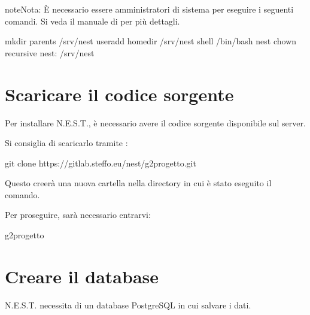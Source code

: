 \documentclass[letterpaper,10pt,italian]{sphinxmanual}
\begin{document}
\begin{sphinxadmonition}{note}{Nota:}
\sphinxAtStartPar
È necessario essere amministratori di sistema per eseguire i seguenti comandi.
Si veda il manuale di  per più dettagli.
\end{sphinxadmonition}

\begin{sphinxVerbatim}[commandchars=\\\{\}]
mkdir \PYGZhy{}\PYGZhy{}parents /srv/nest
useradd \PYGZhy{}\PYGZhy{}home\PYGZhy{}dir /srv/nest \PYGZhy{}\PYGZhy{}shell /bin/bash nest
chown \PYGZhy{}\PYGZhy{}recursive nest: /srv/nest
\end{sphinxVerbatim}


\section{Scaricare il codice sorgente}
\label{\detokenize{guide/installation:scaricare-il-codice-sorgente}}
\sphinxAtStartPar
Per installare N.E.S.T., è necessario avere il codice sorgente disponibile sul server.

\sphinxAtStartPar
Si consiglia di scaricarlo tramite :

\begin{sphinxVerbatim}[commandchars=\\\{\}]
git clone https://gitlab.steffo.eu/nest/g2\PYGZhy{}progetto.git
\end{sphinxVerbatim}

\sphinxAtStartPar
Questo creerà una nuova cartella  nella directory in cui è stato eseguito il comando.

\sphinxAtStartPar
Per proseguire, sarà necessario entrarvi:

\begin{sphinxVerbatim}[commandchars=\\\{\}]
 g2\PYGZhy{}progetto
\end{sphinxVerbatim}


\section{Creare il database}
\label{\detokenize{guide/installation:creare-il-database}}
\sphinxAtStartPar
N.E.S.T. necessita di un database PostgreSQL in cui salvare i dati.
\end{document}
